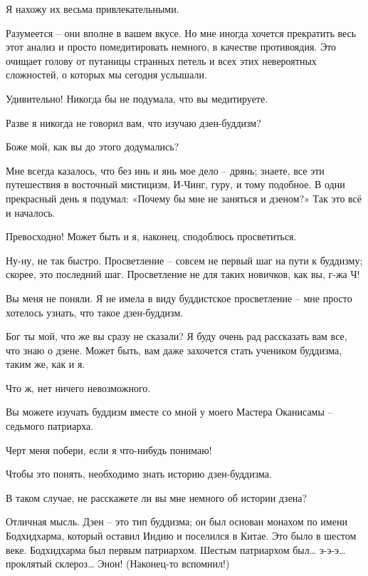 \documentclass[../main.tex]{subfiles}
\begin{document}
\begin{dialogue}
 Я нахожу их весьма привлекательными.

 Разумеется \--- они вполне в вашем вкусе. Но мне иногда хочется прекратить весь этот анализ и просто помедитировать немного, в качестве противоядия. Это очищает голову от путаницы странных петель и всех этих невероятных сложностей, о которых мы сегодня услышали.

 Удивительно! Никогда бы не подумала, что вы медитируете.

 Разве я никогда не говорил вам, что изучаю дзен-буддизм?

 Боже мой, как вы до этого додумались?

 Мне всегда казалось, что без инь и янь мое дело \--- дрянь; знаете, все эти путешествия в восточный мистицизм, И-Чинг, гуру, и тому подобное. В одни прекрасный день я подумал: «Почему бы мне не заняться и дзеном?» Так это всё и началось.

 Превосходно! Может быть и я, наконец, сподоблюсь просветиться.

 Ну-ну, не так быстро. Просветление \--- совсем не первый шаг на пути к буддизму; скорее, это последний шаг. Просветление не для таких новичков, как вы, г-жа Ч!

 Вы меня не поняли. Я не имела в виду буддистское просветление \--- мне просто хотелось узнать, что такое дзен-буддизм.

 Бог ты мой, что же вы сразу не сказали? Я буду очень рад рассказать вам все, что знаю о дзене. Может быть, вам даже захочется стать учеником буддизма, таким же, как и я.

 Что ж, нет ничего невозможного.

 Вы можете изучать буддизм вместе со мной у моего Мастера Оканисамы \--- седьмого патриарха.

 Черт меня побери, если я что-нибудь понимаю!

 Чтобы это понять, необходимо знать историю дзен-буддизма.

 В таком случае, не расскажете ли вы мне немного об истории дзена?

 Отличная мысль. Дзен \--- это тип буддизма; он был основан монахом по имени Бодхидхарма, который оставил Индию и поселился в Китае. Это было в шестом веке. Бодхидхарма был первым патриархом. Шестым патриархом был\ldots{} э-э-э\ldots{} проклятый склероз\ldots{} Энон! (Наконец-то вспомнил!)


\end{dialogue}
\end{document}

